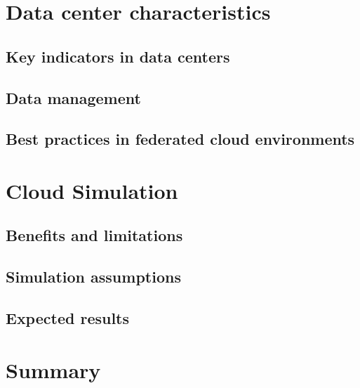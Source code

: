 \section{Data center characteristics}

\subsection{Key indicators in data centers}

\subsection{Data management}

\subsection{Best practices in federated cloud environments}



\section{Cloud Simulation}





\subsection{Benefits and limitations}

\subsection{Simulation assumptions}






\subsection{Expected results}



\section{Summary}



